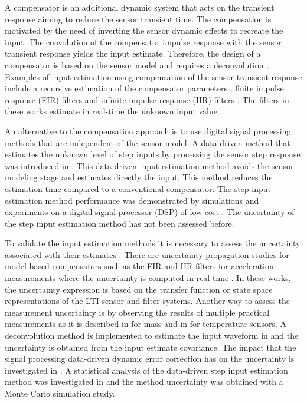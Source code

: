 A compensator is an additional dynamic system that acts on the transient response aiming to reduce the sensor transient time.
The compensation is motivated by the need of inverting the sensor dynamic effects to recreate the input.
The convolution of the compensator impulse response with the sensor transient response yields the input estimate.
Therefore, the design of a compensator is based on the sensor model and requires a deconvolution \cite{Eichstadt10}.
Examples of input estimation using compensation of the sensor transient response include a recursive estimation of the compensator parameters \cite{Shu93}, 
finite impulse response (FIR) \cite{Elster07, Niedzwiecki16b} filters and 
infinite impulse response (IIR) filters \cite{Pintelon90, Elster08}.
The filters in these works estimate in real-time the unknown input value.

An alternative to the compensation approach is to use digital signal processing methods that are independent of the sensor model.
A data-driven method that estimates the unknown level of step inputs by processing the sensor step response was introduced in \cite{Markovsky15ieee}. 
This data-driven input estimation method avoids the sensor modeling stage and estimates directly the input.
This method reduces the estimation time compared to a conventional compensator.
The step input estimation method performance was demonstrated by simulations and experiments on a digital signal processor (DSP) of low cost \cite{Markovsky15cep}.
The uncertainty of the step input estimation method has not been assessed before.

To validate the input estimation methods it is necessary to assess the uncertainty associated with their estimates \cite{daSilva12, Ferrero06}.
There are uncertainty propagation studies for model-based compensators such as the FIR and IIR filters for acceleration measurements where the uncertainty is computed in real time \cite{Elster07, Elster08, Link09}.
In these works, the uncertainty expression is based on the transfer function or state space representations of the LTI sensor and filter systems.
Another way to assess the measurement uncertainty is by observing the results of multiple practical measurements as it is described in \cite{Pietrzak14} for mass and in \cite{Ogorevc16} for temperature sensors.
A deconvolution method is implemented to estimate the input waveform in \cite{Hale09} and the uncertainty is obtained from the input estimate covariance. 
The impact that the signal processing data-driven dynamic error correction has on the uncertainty is investigated in \cite{Saggin01}. 
A statistical analysis of the data-driven step input estimation method \cite{Markovsky15cep} was investigated in \cite{Quintana19} and the method uncertainty was obtained with a Monte Carlo simulation study. 

